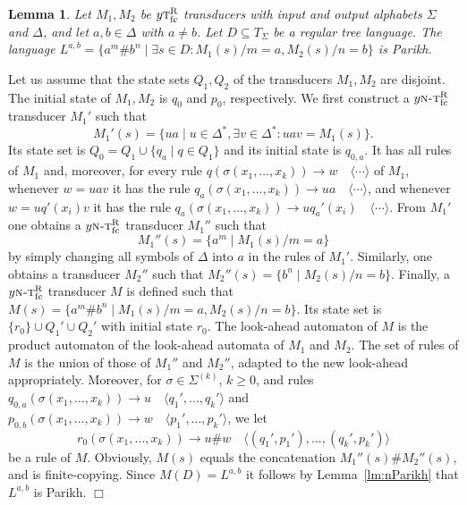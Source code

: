\documentclass[copyright,creativecommons]{eptcs}
\newtheorem{lemma}{Lemma}
\newcommand{\eop}{\hspace*{\fill}$\Box$}
\newenvironment{proof}{{\it Proof.}\quad}{\eop\vspace*{4mm}}
\newcommand{\ntrfc}{\textsc{n-t}^{\text{R}}_{\text{fc}}}
\newcommand{\trfc}{\textsc{t}^{\text{R}}_{\text{fc}}}
\begin{document}
\begin{lemma}\rm\label{lm:ab}
Let $M_1, M_2$ be $y\trfc$ transducers with input and output alphabets $\Sigma$ and $\Delta$, 
and let $a,b\in\Delta$ with $a\not=b$.
Let $D\subseteq T_\Sigma$ be a regular tree language.
The language $L^{a,b}=\{a^m\# b^n\mid \exists s\in D: M_1(s)/m=a, M_2(s)/n=b\}$ is Parikh.
\end{lemma}
\begin{proof}
Let us assume that the state sets $Q_1, Q_2$ of the transducers $M_1,M_2$ are
disjoint. The initial state of $M_1, M_2$ is $q_0$ and $p_0$, respectively.
We first construct a $y\ntrfc$ transducer $M_1'$ such that 
\[
M_1'(s)=\{ua\mid u\in\Delta^*, \exists v\in\Delta^*: uav = M_1(s)\}.
\]
Its state set is $Q_0=Q_1\cup \{q_a\mid q\in Q_1\}$ and its initial state is $q_{0,a}$.
It has all rules of $M_1$ and, moreover, for every rule 
$q(\sigma(x_1,\dots,x_k))\to w\quad\langle\cdots\rangle$
of $M_1$, whenever $w=uav$ it has the rule 
$q_a(\sigma(x_1,\dots,x_k))\to ua\quad\langle\cdots\rangle$, and whenever
$w=uq'(x_i)v$ it has the rule  
$q_a(\sigma(x_1,\dots,x_k))\to uq_a'(x_i)\quad\langle\cdots\rangle$.
From $M_1'$ one obtains a $y\ntrfc$ transducer $M_1''$ such that
\[
M_1''(s)=\{a^m\mid M_1(s)/m=a\}
\]
by simply changing all symbols of $\Delta$
into $a$  in the rules of $M_1'$. Similarly, one obtains a transducer $M_2''$ 
such that $M_2''(s)=\{b^n\mid M_2(s)/n=b\}$.
Finally, a $y\ntrfc$ transducer $M$ is defined such that 
$M(s)=\{ a^m\# b^n\mid M_1(s)/m=a, M_2(s)/n=b\}$.
Its state set is $\{ r_0\}\cup Q_1' \cup Q_2'$ with initial state $r_0$. 
The look-ahead automaton of $M$ is the product automaton of the
look-ahead automata of $M_1$ and $M_2$. 
The set of rules of $M$ is the union of those of $M_1''$ and $M_2''$, adapted 
to the new look-ahead appropriately. 
Moreover, for $\sigma\in\Sigma^{(k)}$, $k\geq 0$, and rules
$q_{0,a}(\sigma(x_1,\dots,x_k))\to u\quad\langle q_1',\dots,q_k'\rangle$ and
$p_{0,b}(\sigma(x_1,\dots,x_k))\to w\quad\langle p_1',\dots,p_k'\rangle$, we let 
\[
r_0(\sigma(x_1,\dots,x_k))\to u\# w\quad\langle (q_1',p_1'),\dots,(q_k',p_k')\rangle
\]
be a rule of $M$. 
Obviously, $M(s)$ equals the concatenation $M_1''(s)\# M_2''(s)$,
and is finite-copying.
Since $M(D)=L^{a,b}$ it follows by Lemma~\ref{lm:nParikh} that $L^{a,b}$ is Parikh.
\end{proof}
\end{document}
